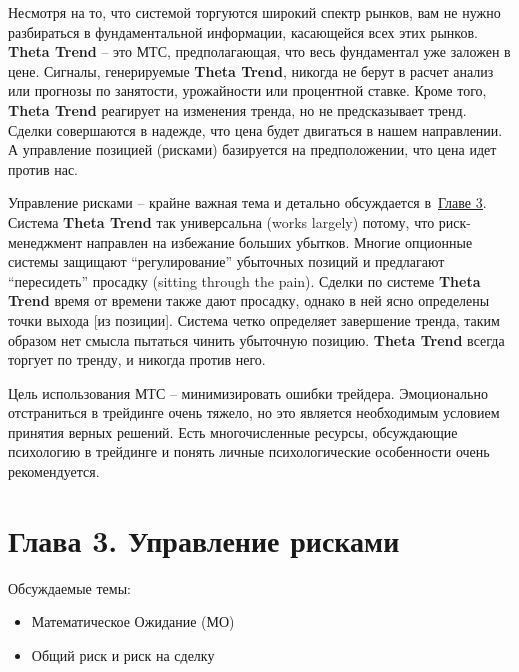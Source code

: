 \documentclass[12pt,DIV=18]{scrartcl}
\begin{document}
\bigskip

Несмотря на то, что системой торгуются широкий спектр рынков, вам не нужно разбираться в фундаментальной информации, касающейся всех этих рынков. \textbf{Theta Trend} -- это МТС, предполагающая, что весь фундаментал уже заложен в цене. Сигналы, генерируемые \textbf{Theta Trend}, никогда не берут в расчет анализ или прогнозы по занятости, урожайности или процентной ставке. Кроме того, \textbf{Theta Trend} реагирует на изменения тренда, но не предсказывает тренд. Сделки совершаются в надежде, что цена будет двигаться в нашем направлении. А управление позицией (рисками) базируется на предположении, что цена идет против нас.

\bigskip

Управление рисками -- крайне важная тема и детально обсуждается в~\hyperref[chapter3]{\ul{Главе 3}}. Система \textbf{Theta Trend} так универсальна (works  largely) потому, что риск-менеджмент направлен на избежание больших убытков. Многие опционные системы защищают ``регулирование'' убыточных позиций и предлагают ``пересидеть'' просадку (sitting through the pain). Сделки по системе \textbf{Theta Trend} время от времени также дают просадку, однако в ней ясно определены точки выхода [из позиции]. Система четко определяет завершение тренда, таким образом нет смысла пытаться чинить убыточную позицию. \textbf{Theta Trend} всегда торгует по тренду, и никогда против него.

\bigskip

Цель использования МТС -- минимизировать ошибки трейдера. Эмоционально отстраниться в трейдинге очень тяжело, но это является необходимым условием принятия верных решений. Есть многочисленные ресурсы, обсуждающие психологию в трейдинге и понять личные психологические особенности очень рекомендуется.

\section*{Глава 3. Управление рисками}
\label{chapter3}
\bigskip

Обсуждаемые темы:

\begin{itemize}
\item Математическое Ожидание (МО)
\item Общий риск и риск на сделку
\end{itemize}

\bigskip
\end{document}
